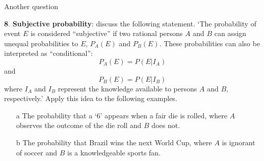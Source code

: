 \documentclass{beamer}
\begin{document}
\begin{frame}{Another question}

\textbf{8}. \textbf{Subjective probability}: discuss the following
statement. `The probability of event $E$ is considered ``subjective''
if two rational persons $A$ and $B$ can assign unequal probabilities
to $E$, $P_A(E)$ and $P_B(E)$. These probabilities can also be
interpreted as ``conditional'':
$$P_A(E) = P(E|I_A)$$
and
$$P_B(E) = P (E|I_B)$$
where $I_A$ and $I_B$ represent the knowledge available to persons $A$ and $B$,
respectively.' Apply this idea to the following examples.
\begin{itemize}
\item[a] The probability that a `6' appears when a fair die is rolled, where $A$
  observes the outcome of the die roll and $B$ does not.
\item[b] The probability that Brazil wins the next World Cup, where $A$ is ignorant of soccer and $B$ is a knowledgeable sports fan.
  \end{itemize}
\end{frame}
\end{document}
